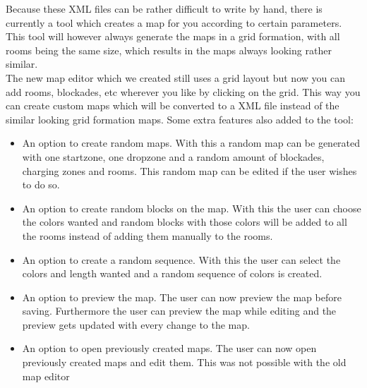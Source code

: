 Because these XML files can be rather difficult to write by hand, there is currently a tool which creates a map for you according to certain parameters. This tool will however always generate the maps in a grid formation, with all rooms being the same size, which results in the maps always looking rather similar. \\
The new map editor which we created still uses a grid layout but now you can add rooms, blockades, etc wherever you like by clicking on the grid. This way you can create custom maps which will be converted to a XML file instead of the similar looking grid formation maps. 
Some extra features also added to the tool:
\begin{itemize}
\item An option to create random maps. With this a random map can be generated with one startzone, one dropzone and a random amount of blockades, charging zones and rooms. This random map can be edited if the user wishes to do so.
\item An option to create random blocks on the map. With this the user can choose the colors wanted and random blocks with those colors will be added to all the rooms instead of adding them manually to the rooms.
\item An option to create a random sequence. With this the user can select the colors and length wanted and a random sequence of colors is created.
\item An option to preview the map. The user can now preview the map before saving. Furthermore the user can preview the map while editing and the preview gets updated with every change to the map.
\item An option to open previously created maps. The user can now open previously created maps and edit them. This was not possible with the old map editor
\end{itemize}
